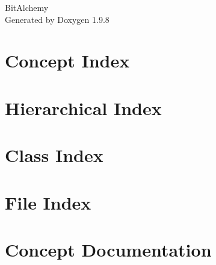 \documentclass[twoside]{book}
\newcommand{\+}{\discretionary{\mbox{\scriptsize$\hookleftarrow$}}{}{}}
\newcommand{\clearemptydoublepage}{%
    \newpage{\pagestyle{empty}\cleardoublepage}%
  }
\begin{document}
  \raggedbottom
    \hypersetup{pageanchor=false,
                bookmarksnumbered=true,
                pdfencoding=unicode
               }
  \begin{titlepage}
  \vspace*{7cm}
  \begin{center}%
  {\Large Bit\+Alchemy}\\
  \vspace*{1cm}
  {\large Generated by Doxygen 1.9.8}\\
  \end{center}
  \end{titlepage}
  \clearemptydoublepage
  \tableofcontents
  \clearemptydoublepage
  \hypersetup{pageanchor=true}
\chapter{Concept Index}

\chapter{Hierarchical Index}

\chapter{Class Index}

\chapter{File Index}

\chapter{Concept Documentation}




\end{document}

